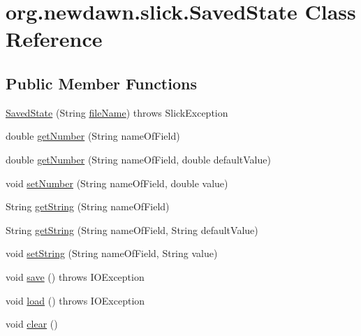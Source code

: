 \hypertarget{classorg_1_1newdawn_1_1slick_1_1_saved_state}{}\section{org.\+newdawn.\+slick.\+Saved\+State Class Reference}
\label{classorg_1_1newdawn_1_1slick_1_1_saved_state}
\subsection*{Public Member Functions}
\begin{DoxyCompactItemize}
\item 
\mbox{\hyperlink{classorg_1_1newdawn_1_1slick_1_1_saved_state_aef2409061a497111c6a6b64a798af41d}{Saved\+State}} (String \mbox{\hyperlink{classorg_1_1newdawn_1_1slick_1_1_saved_state_ace5c7436bfdba5164f2b1826bb173388}{file\+Name}})  throws Slick\+Exception 
\item 
double \mbox{\hyperlink{classorg_1_1newdawn_1_1slick_1_1_saved_state_a6daea1aaa6e5d6121457332cb5728af2}{get\+Number}} (String name\+Of\+Field)
\item 
double \mbox{\hyperlink{classorg_1_1newdawn_1_1slick_1_1_saved_state_a02c20e8a5b92fabf133ccebf295cb492}{get\+Number}} (String name\+Of\+Field, double default\+Value)
\item 
void \mbox{\hyperlink{classorg_1_1newdawn_1_1slick_1_1_saved_state_ab0249cdc735869ea0fe006e0004021d5}{set\+Number}} (String name\+Of\+Field, double value)
\item 
String \mbox{\hyperlink{classorg_1_1newdawn_1_1slick_1_1_saved_state_a360539d1b89bf1eb115c2d3227a0c7a1}{get\+String}} (String name\+Of\+Field)
\item 
String \mbox{\hyperlink{classorg_1_1newdawn_1_1slick_1_1_saved_state_ac2e99c29bc57e9dfae89446cdd9ae6a3}{get\+String}} (String name\+Of\+Field, String default\+Value)
\item 
void \mbox{\hyperlink{classorg_1_1newdawn_1_1slick_1_1_saved_state_a28ee41003a982243b0ebf820a169ff90}{set\+String}} (String name\+Of\+Field, String value)
\item 
void \mbox{\hyperlink{classorg_1_1newdawn_1_1slick_1_1_saved_state_aa611e00cc3b27ac35104a970c41791f8}{save}} ()  throws I\+O\+Exception 
\item 
void \mbox{\hyperlink{classorg_1_1newdawn_1_1slick_1_1_saved_state_a40cf0eea8c044407bfdee0e801887ed8}{load}} ()  throws I\+O\+Exception 
\item 
void \mbox{\hyperlink{classorg_1_1newdawn_1_1slick_1_1_saved_state_a4784b56dee7616e98dd456b8c92f7212}{clear}} ()
\end{DoxyCompactItemize}
